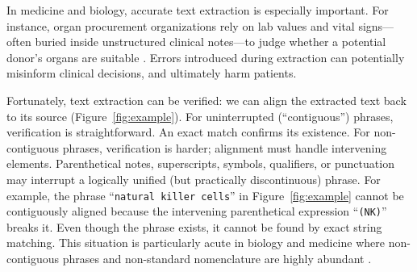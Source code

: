 \documentclass[10pt,twocolumn]{article}
\theoremstyle{plain}
\theoremstyle{definition}
\theoremstyle{remark}
\begin{document}
In medicine and biology, accurate text extraction is especially important. For instance, organ procurement organizations rely on lab values and vital signs---often buried inside unstructured clinical notes---to judge whether a potential donor's organs are suitable \citep{Adam2025ClinicalExtraction}. Errors introduced during extraction can potentially misinform clinical decisions, and ultimately harm patients.

Fortunately, text extraction can be verified: we can align the extracted text back to its source (Figure~\ref{fig:example}). For uninterrupted (``contiguous'') phrases, verification is straightforward. An exact match confirms its existence. For non-contiguous phrases, verification is harder; alignment must handle intervening elements. Parenthetical notes, superscripts, symbols, qualifiers, or punctuation may interrupt a logically unified (but practically discontinuous) phrase. For example, the phrase ``\texttt{natural killer cells}'' in Figure~\ref{fig:example} cannot be contiguously aligned because the intervening parenthetical expression ``\texttt{(NK)}'' breaks it. Even though the phrase exists, it cannot be found by exact string matching. This situation is particularly acute in biology and medicine where non-contiguous phrases and non-standard nomenclature are highly abundant \citep{Lever2020NCS,Shinohara2024NCS}. 
\end{document}
